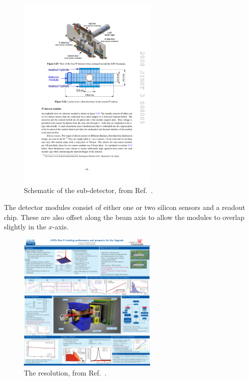 \begin{figure}[!h]
    \centering
    \includegraphics[width=0.6\textwidth]{figs/Detector/it_layout.pdf}
    \caption{Schematic of the \intr sub-detector, from Ref.~\cite{Alves:2008zz}.}
    \label{fig:Dec_it_layout}   
\end{figure}

The detector modules consist of either one or two silicon sensors and a readout chip. These are also offset along the beam axis to allow the modules to overlap slightly in the $x$-axis.



\begin{figure}[!h]
    \centering
    \includegraphics[width=0.6\textwidth]{figs/Detector/it_resolution.pdf}
    \caption{The \ttracker resolution, from Ref.~\cite{LHCb-DP-2014-002}.}
    \label{fig:Dec_velo_leakage_current}   
\end{figure}

